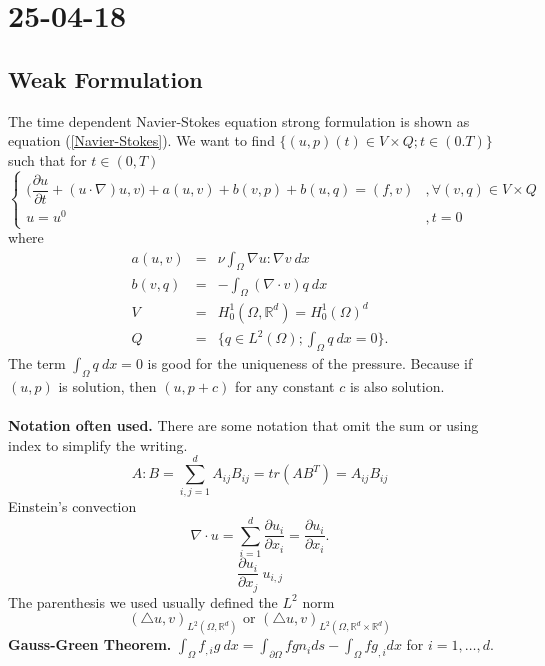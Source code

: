 \documentclass[a4paper,10pt]{article}
\newcommand{\R}{\mathbb{R}}
\begin{document}
\newpage
\section{25-04-18}

\subsection{Weak Formulation}
The time dependent Navier-Stokes equation strong formulation is shown as equation (\ref{Navier-Stokes}). We want to find $ \{ (u,p)(t) \in V \times Q ; t \in (0.T) \} $ such that for $ t \in (0,T) $
\begin{equation} \label{NS_Weak}
\begin{cases}
\big( \dfrac{\partial u}{\partial t} + (u \cdot \nabla)u,v \big) + a(u,v) + b(v,p) + b(u,q) = (f,v) & ,\forall(v,q)\in V\times Q \\ u=u^{0} & , t=0
\end{cases}
\end{equation}
where
\begin{eqnarray}\nonumber
a(u,v) &=& \nu \int_{\Omega} \nabla u : \nabla v \ dx \\ \nonumber
b(v,q) &=& - \int_{\Omega} (\nabla \cdot v) q \ dx \\ \nonumber
V &=& H_{0}^{1}(\Omega, \R^d) = H_{0}^{1}(\Omega)^d \\ \nonumber
Q &=& \{ q\in L^2(\Omega) ; \int_{\Omega} q \ dx=0 \}.
\end{eqnarray}
The term $ \int_{\Omega} q \ dx=0 $ is good for the uniqueness of the pressure. Because if $ (u,p) $ is solution, then $ (u,p+c) $ for any constant $ c $ is also solution. \\ \\
\textbf{Notation often used.} There are some notation that omit the sum or using index to simplify the writing.\\
\[ A : B = \sum_{i,j=1}^{d} A_{ij}B_{ij} = tr(AB^{T}) = A_{ij}B_{ij} \]
Einstein's convection
\[ \nabla \cdot u = \sum_{i=1}^{d} \dfrac{\partial u_{i}}{\partial x_{i}} = \dfrac{\partial u_{i}}{\partial x_{i}}. \]
\[ \dfrac{\partial u_{i}}{\partial x_{j}} \ u_{i,j} \]
The parenthesis we used usually defined the $ L^2 $ norm
\[ (\bigtriangleup u, v)_{L^2(\Omega,\R^d)} \text{ or } (\bigtriangleup u, v)_{L^2(\Omega,\R^d \times \R^d)}  \]
\textbf{Gauss-Green Theorem.} $ \int_{\Omega} f_{,i} g \ dx = \int_{\partial \Omega} f g n_{i} ds - \int_{\Omega} f g_{,i} dx $ for $ i=1, \dots, d $.\\\\
\end{document}
